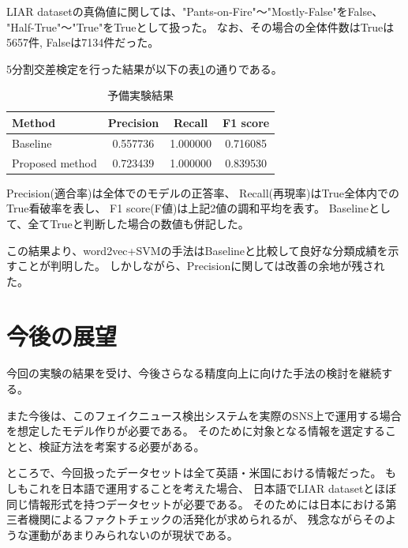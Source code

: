 \documentclass[twocolumn, a4paper, uplatex]{UECIEresume}
\begin{document}
LIAR datasetの真偽値に関しては、"Pants-on-Fire"〜"Mostly-False"をFalse、
"Half-True"〜"True"をTrueとして扱った。
なお、その場合の全体件数はTrueは5657件, Falseは7134件だった。

5分割交差検定を行った結果が以下の表\ref{tb:result}の通りである。

\begin{table}[h]
  \begin{center}
    \caption{予備実験結果}
    \label{tb:result}
    \begin{tabular}{l c c c}
      \hline
      Method & Precision & Recall & F1 score \\
      \hline
      Baseline & 0.557736 & 1.000000 & 0.716085\\
      Proposed method & 0.723439 & 1.000000 & 0.839530\\
      \hline
    \end{tabular}
  \end{center}
\end{table}

Precision(適合率)は全体でのモデルの正答率、
Recall(再現率)はTrue全体内でのTrue看破率を表し、
F1 score(F値)は上記2値の調和平均を表す。
Baselineとして、全てTrueと判断した場合の数値も併記した。

この結果より、word2vec+SVMの手法はBaselineと比較して良好な分類成績を示すことが判明した。
しかしながら、Precisionに関しては改善の余地が残された。

\section{今後の展望}
今回の実験の結果を受け、今後さらなる精度向上に向けた手法の検討を継続する。

また今後は、このフェイクニュース検出システムを実際のSNS上で運用する場合を想定したモデル作りが必要である。
そのために対象となる情報を選定することと、検証方法を考案する必要がある。

ところで、今回扱ったデータセットは全て英語・米国における情報だった。
もしもこれを日本語で運用することを考えた場合、
日本語でLIAR datasetとほぼ同じ情報形式を持つデータセットが必要である。
そのためには日本における第三者機関によるファクトチェックの活発化が求められるが、
残念ながらそのような運動があまりみられないのが現状である。
\end{document}
